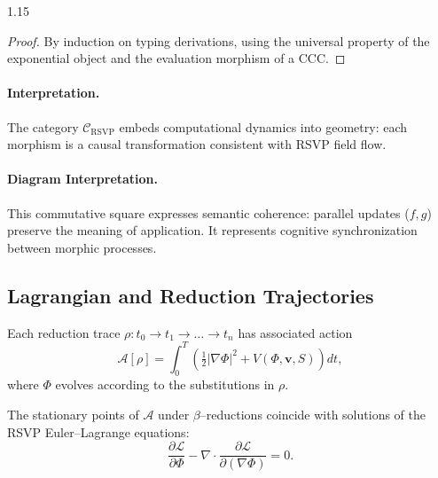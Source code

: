 \documentclass[12pt,a4paper]{article}
\begin{document}
\begin{spacing}{1.15}
\begin{proof}
By induction on typing derivations,
using the universal property of the exponential object
and the evaluation morphism of a CCC.
\end{proof}

\paragraph{Interpretation.}
The category $\mathcal{C}_{\mathrm{RSVP}}$
embeds computational dynamics into geometry:
each morphism is a causal transformation consistent with RSVP field flow.


\paragraph{Diagram Interpretation.}
This commutative square expresses semantic coherence:
parallel updates ($f,g$) preserve the meaning of application.
It represents cognitive synchronization between morphic processes.

\subsection{Lagrangian and Reduction Trajectories}

\begin{definition}
\label{def:action}
Each reduction trace $\rho : t_0 \to t_1 \to \dots \to t_n$
has associated action
\[
  \mathcal{A}[\rho] = \int_0^T
  \left(
     \tfrac{1}{2}|\nabla\Phi|^2 +
     V(\Phi,\mathbf{v},S)
  \right) dt,
\]
where $\Phi$ evolves according to the substitutions in $\rho$.
\end{definition}

\begin{theorem}
\label{thm:equiv}
The stationary points of $\mathcal{A}$ under $\beta$--reductions
coincide with solutions of the RSVP Euler–Lagrange equations:
\[
  \frac{\partial \mathcal{L}}{\partial \Phi}
  - \nabla\cdot\frac{\partial \mathcal{L}}{\partial(\nabla\Phi)} = 0.
\]
\end{theorem}


\end{spacing}
\end{document}
